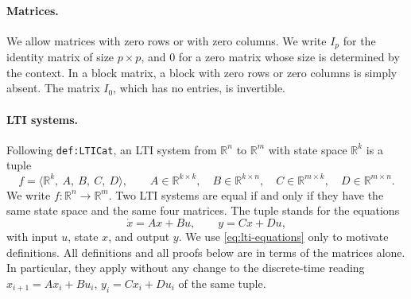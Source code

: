 \documentclass[11pt,a4paper]{article}
\theoremstyle{plain}
\theoremstyle{definition}
\theoremstyle{remark}
\newcommand{\R}{\mathbb{R}}
\newcommand{\sys}[5]{\bigl\langle #1,\ #2,\ #3,\ #4,\ #5 \bigr\rangle}
\newcommand{\lbl}[1]{\nolinkurl{#1}}
\begin{document}
\paragraph{Matrices.}
We allow matrices with zero rows or with zero columns.
We write $I_p$ for the identity matrix of size $p \times p$, and $0$ for a zero matrix whose size is determined by the context.
In a block matrix, a block with zero rows or zero columns is simply absent.
The matrix $I_0$, which has no entries, is invertible.

\paragraph{LTI systems.}
Following \lbl{def:LTICat}, an LTI system from $\R^n$ to $\R^m$ with state space $\R^k$ is a tuple
\begin{equation}
    f = \sys{\R^k}{A}{B}{C}{D},
    \qquad
    A \in \R^{k \times k}, \quad
    B \in \R^{k \times n}, \quad
    C \in \R^{m \times k}, \quad
    D \in \R^{m \times n}.
\end{equation}
We write $f \colon \R^n \to \R^m$.
Two LTI systems are equal if and only if they have the same state space and the same four matrices.
The tuple stands for the equations
\begin{equation}
    \label{eq:lti-equations}
    \dot x = A x + B u, \qquad y = C x + D u,
\end{equation}
with input $u$, state $x$, and output $y$.
We use \cref{eq:lti-equations} only to motivate definitions.
All definitions and all proofs below are in terms of the matrices alone.
In particular, they apply without any change to the discrete-time reading $x_{i+1} = A x_i + B u_i$, $y_i = C x_i + D u_i$ of the same tuple.
\end{document}
